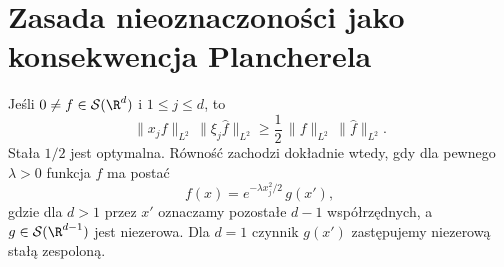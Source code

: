 \section{Zasada nieoznaczoności jako konsekwencja Plancherela}
\label{sec:pde8-uncertainty}

\begin{twierdzenie}
\label{thm:pde8-uncertainty}
Jeśli $0\ne f\in\mathcal S(\R^d)$ i $1\le j\le d$, to
\[
 \|x_jf\|_{L^2}\,\|\xi_j\widehat f\|_{L^2}
 \ge\frac12\,\|f\|_{L^2}\,\|\widehat f\|_{L^2}.
\]
Stała $1/2$ jest optymalna. Równość zachodzi
dokładnie wtedy, gdy dla pewnego $\lambda>0$
funkcja $f$ ma postać
\[
 f(x)=e^{-\lambda x_j^2/2}\,g(x'),
\]
gdzie dla $d>1$ przez $x'$ oznaczamy pozostałe
$d-1$ współrzędnych, a $g\in\mathcal S(\R^{d-1})$
jest niezerowa. Dla $d=1$ czynnik $g(x')$
zastępujemy niezerową stałą zespoloną.
\end{twierdzenie}
